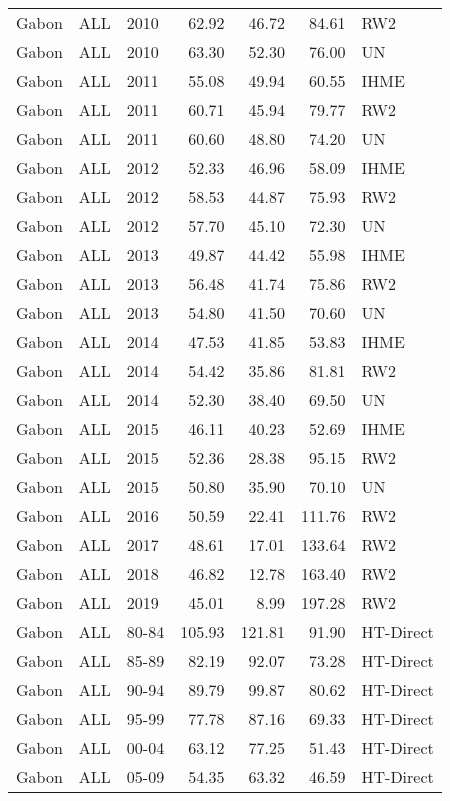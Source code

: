 \begin{longtable}{lllrrrl}
  Gabon & ALL & 2010 & 62.92 & 46.72 & 84.61 & RW2 \\ 
  Gabon & ALL & 2010 & 63.30 & 52.30 & 76.00 & UN \\ 
  Gabon & ALL & 2011 & 55.08 & 49.94 & 60.55 & IHME \\ 
  Gabon & ALL & 2011 & 60.71 & 45.94 & 79.77 & RW2 \\ 
  Gabon & ALL & 2011 & 60.60 & 48.80 & 74.20 & UN \\ 
  Gabon & ALL & 2012 & 52.33 & 46.96 & 58.09 & IHME \\ 
  Gabon & ALL & 2012 & 58.53 & 44.87 & 75.93 & RW2 \\ 
  Gabon & ALL & 2012 & 57.70 & 45.10 & 72.30 & UN \\ 
  Gabon & ALL & 2013 & 49.87 & 44.42 & 55.98 & IHME \\ 
  Gabon & ALL & 2013 & 56.48 & 41.74 & 75.86 & RW2 \\ 
  Gabon & ALL & 2013 & 54.80 & 41.50 & 70.60 & UN \\ 
  Gabon & ALL & 2014 & 47.53 & 41.85 & 53.83 & IHME \\ 
  Gabon & ALL & 2014 & 54.42 & 35.86 & 81.81 & RW2 \\ 
  Gabon & ALL & 2014 & 52.30 & 38.40 & 69.50 & UN \\ 
  Gabon & ALL & 2015 & 46.11 & 40.23 & 52.69 & IHME \\ 
  Gabon & ALL & 2015 & 52.36 & 28.38 & 95.15 & RW2 \\ 
  Gabon & ALL & 2015 & 50.80 & 35.90 & 70.10 & UN \\ 
  Gabon & ALL & 2016 & 50.59 & 22.41 & 111.76 & RW2 \\ 
  Gabon & ALL & 2017 & 48.61 & 17.01 & 133.64 & RW2 \\ 
  Gabon & ALL & 2018 & 46.82 & 12.78 & 163.40 & RW2 \\ 
  Gabon & ALL & 2019 & 45.01 & 8.99 & 197.28 & RW2 \\ 
  Gabon & ALL & 80-84 & 105.93 & 121.81 & 91.90 & HT-Direct \\ 
  Gabon & ALL & 85-89 & 82.19 & 92.07 & 73.28 & HT-Direct \\ 
  Gabon & ALL & 90-94 & 89.79 & 99.87 & 80.62 & HT-Direct \\ 
  Gabon & ALL & 95-99 & 77.78 & 87.16 & 69.33 & HT-Direct \\ 
  Gabon & ALL & 00-04 & 63.12 & 77.25 & 51.43 & HT-Direct \\ 
  Gabon & ALL & 05-09 & 54.35 & 63.32 & 46.59 & HT-Direct \\ 

\end{longtable}
